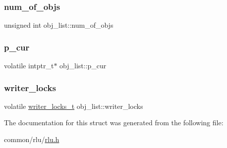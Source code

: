 \mbox{\label{structobj__list_a000d5c402401e9a96a0637ed95e8539f}} 
\subsubsection{\texorpdfstring{num\+\_\+of\+\_\+objs}{num\_of\_objs}}
{\footnotesize\ttfamily unsigned int obj\+\_\+list\+::num\+\_\+of\+\_\+objs}

\mbox{\label{structobj__list_abd1b71e81f3a09630ef9307fa3a13f02}} 
\subsubsection{\texorpdfstring{p\+\_\+cur}{p\_cur}}
{\footnotesize\ttfamily volatile intptr\+\_\+t$\ast$ obj\+\_\+list\+::p\+\_\+cur}

\mbox{\label{structobj__list_a2a8548d3319e930e691a6350adea720c}} 
\subsubsection{\texorpdfstring{writer\+\_\+locks}{writer\_locks}}
{\footnotesize\ttfamily volatile \hyperlink{rlu_8h_a96757ec58e867aecee96e5f992035057}{writer\+\_\+locks\+\_\+t} obj\+\_\+list\+::writer\+\_\+locks}



The documentation for this struct was generated from the following file\+:\begin{DoxyCompactItemize}
\item 
common/rlu/\hyperlink{rlu_8h}{rlu.\+h}\end{DoxyCompactItemize}
